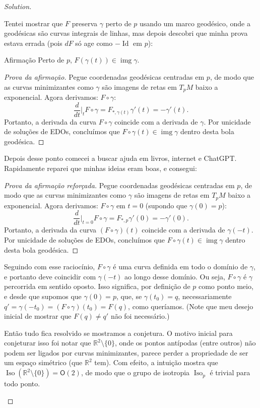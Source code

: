 \begin{proof}[Solution]
\begin{enumerate}[label=(\alph*)]
	Tentei mostrar que \(F\) preserva \(\gamma\) perto de \(p\) usando um marco geodésico, onde a geodésicas são curvas integrais de linhas, mas depois descobri que minha prova estava errada (pois \(dF\) só age como \(-\operatorname{Id}\) em \(p\)):
	\begin{thing8}{Afirmação}\leavevmode
	Perto de \(p\), \(F(\gamma(t)) \in \operatorname{img} \gamma\).
	\end{thing8}
	\begin{proof}[Prova da afirmação]\leavevmode
	Pegue coordenadas geodésicas centradas em \(p\), de modo que as curvas minimizantes como \(\gamma\) são imagens de retas em \(T_pM\) baixo a exponencial. Agora derivamos: \(F \circ \gamma\):
	\[\frac{d}{dt}\Big|_{t}F \circ \gamma=F_{*,\gamma(t)}\gamma'(t)=-\gamma'(t).\]
	Portanto, a derivada da curva \(F \circ \gamma\) coincide com a derivada de \(\gamma\). Por unicidade de soluções de EDOs, concluímos que \(F \circ \gamma(t) \in \operatorname{img} \gamma\) dentro desta bola geodésica.
	\end{proof}
Depois desse ponto comecei a buscar ajuda em livros, internet e ChatGPT. Rapidamente reparei que minhas ideias eram boas, e consegui:
	\begin{proof}[Prova da afirmação reforçada]\leavevmode
	Pegue coordenadas geodésicas centradas em \(p\), de modo que as curvas minimizantes como \(\gamma\) são imagens de retas em \(T_pM\) baixo a exponencial. Agora derivamos: \(F \circ \gamma\) em \(t=0\) (supondo que \(\gamma(0)=p\)):
	\[\frac{d}{dt}\Big|_{t=0}F \circ \gamma=F_{*,p}\gamma'(0)=-\gamma'(0).\]
	Portanto, a derivada da curva \((F \circ \gamma)(t)\) coincide com a derivada de \(\gamma(-t)\). Por unicidade de soluções de EDOs, concluímos que \(F \circ \gamma(t) \in \operatorname{img} \gamma\) dentro desta bola geodésica.
	\end{proof}
Seguindo com esse raciocínio, \(F \circ \gamma\) é uma curva definida em todo o domínio de \(\gamma\), e portanto deve coincidir com \(\gamma(-t)\) ao longo desse domínio. Ou seja, \(F \circ \gamma\) é \(\gamma\) percorrida em sentido oposto. Isso significa, por definição de \(p\) como ponto meio, e desde que supomos que \(\gamma(0)=p\), que, se \(\gamma(t_0)=q\), necessariamente \(q'=\gamma(-t_0)=(F \circ \gamma)(t_0)=F(q)\), como queríamos. (Note que meu desejo inicial de mostrar que \(F(q)\neq q'\) não foi necessário.)

Então tudo fica resolvido se mostramos a conjetura. O motivo inicial para conjeturar isso foi notar que \(\mathbb{R}^2\setminus\{0\}\), onde os pontos antípodas (entre outros) não podem ser ligados por curvas minimizantes, parece perder a propriedade de ser um espaço simétrico (que \(\mathbb{R}^{2}\) tem). Com efeito, a intuição mostra que \(\operatorname{Iso}(\mathbb{R}^2\setminus\{0\})=\mathsf{O}(2)\), de modo que o grupo de isotropia \(\operatorname{Iso}_p\) é trivial para todo ponto.


\end{enumerate}
\end{proof}
